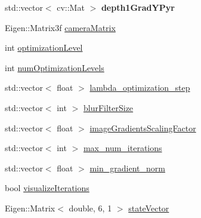 \begin{DoxyCompactItemize}
\item 
\hypertarget{class_photoconsistency_odometry_1_1_bi_objective_1_1_c_photoconsistency_odometry_bi_objective_afd12f2aa0be1a04538ce40e9fefc5c32}{
std::vector$<$ cv::Mat $>$ {\bfseries depth1GradYPyr}}
\label{class_photoconsistency_odometry_1_1_bi_objective_1_1_c_photoconsistency_odometry_bi_objective_afd12f2aa0be1a04538ce40e9fefc5c32}

\item 
Eigen::Matrix3f \hyperlink{class_photoconsistency_odometry_1_1_bi_objective_1_1_c_photoconsistency_odometry_bi_objective_a74d4c192feef1afef8a8d8e2a0355899}{cameraMatrix}
\item 
int \hyperlink{class_photoconsistency_odometry_1_1_bi_objective_1_1_c_photoconsistency_odometry_bi_objective_a091fe96422095cde49e8dbf0f588c68f}{optimizationLevel}
\item 
int \hyperlink{class_photoconsistency_odometry_1_1_bi_objective_1_1_c_photoconsistency_odometry_bi_objective_a446eabe1e440d02158f2333fa19263fb}{numOptimizationLevels}
\item 
std::vector$<$ float $>$ \hyperlink{class_photoconsistency_odometry_1_1_bi_objective_1_1_c_photoconsistency_odometry_bi_objective_ab0228ea77ced9d4717870907e435c137}{lambda\_\-optimization\_\-step}
\item 
std::vector$<$ int $>$ \hyperlink{class_photoconsistency_odometry_1_1_bi_objective_1_1_c_photoconsistency_odometry_bi_objective_a3eb4895b36bfd0bb7c1b19bff7e85694}{blurFilterSize}
\item 
std::vector$<$ float $>$ \hyperlink{class_photoconsistency_odometry_1_1_bi_objective_1_1_c_photoconsistency_odometry_bi_objective_a0a5c463a29e8b400d7f8137f3f55fe79}{imageGradientsScalingFactor}
\item 
std::vector$<$ int $>$ \hyperlink{class_photoconsistency_odometry_1_1_bi_objective_1_1_c_photoconsistency_odometry_bi_objective_a92cf677b2555e928f70401e87285841f}{max\_\-num\_\-iterations}
\item 
std::vector$<$ float $>$ \hyperlink{class_photoconsistency_odometry_1_1_bi_objective_1_1_c_photoconsistency_odometry_bi_objective_a4ffb9e6e6dfd284941f8e00488506f50}{min\_\-gradient\_\-norm}
\item 
bool \hyperlink{class_photoconsistency_odometry_1_1_bi_objective_1_1_c_photoconsistency_odometry_bi_objective_aa6a0112aba3c34e3c523612694e2ec69}{visualizeIterations}
\item 
Eigen::Matrix$<$ double, 6, 1 $>$ \hyperlink{class_photoconsistency_odometry_1_1_bi_objective_1_1_c_photoconsistency_odometry_bi_objective_a1ca67345fb32011d2af5db3d9d512ca1}{stateVector}

\end{DoxyCompactItemize}
